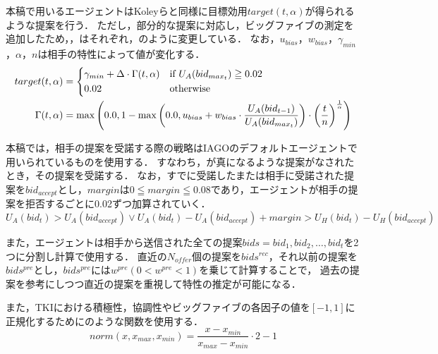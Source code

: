 本稿で用いるエージェントはKoleyらと同様に目標効用$target(t,\alpha)$が得られるような提案を行う．
ただし，部分的な提案に対応し，ビッグファイブの測定を追加したため，，はそれぞれ，のように変更している．
なお，$u_{bias}$，$w_{bias}$，$\gamma_{min}$，$\alpha$，$n$は相手の特性によって値が変化する．
\begin{align}
    target(t,\alpha) &= 
    \begin{cases*}
        \gamma_{min} + \Delta \cdot \Gamma(t,\alpha) & if $U_A(bid_{max_t}) \geqq 0.02$  \\
        0.02 & otherwise 
    \end{cases*} \label{eq:newtarget}\\
    \Gamma(t,\alpha) &= \max \left( 0.0, 1 - \max \left( 0.0, u_{bias} + w_{bias} \cdot \frac{U_A(bid_{t - 1})}{U_A(bid_{max_t})} \right) \cdot \left( \frac{t}{n} \right)^{\frac{1}{\alpha}} \right) \label{eq:newgamma}
\end{align}

本稿では，相手の提案を受諾する際の戦略はIAGOのデフォルトエージェントで用いられているものを使用する．
すなわち，が真になるような提案がなされたとき，その提案を受諾する．
なお，すでに受諾したまたは相手に受諾された提案を$bid_{accept}$とし，$margin$は$0 \leqq margin \leqq 0.08$であり，エージェントが相手の提案を拒否するごとに0.02ずつ加算されていく．
\begin{equation}
    U_A(bid_t) > U_A(bid_{accept}) \vee  U_A(bid_t) - U_A(bid_{accept}) + margin > U_H(bid_t) - U_H(bid_{accept}) 
    \label{eq:acceptance}
\end{equation}

また，エージェントは相手から送信された全ての提案$bids = {bid_1, bid_2, \ldots , bid_t}$を2つに分割し計算で使用する．
直近の$N_{offer}$個の提案を$bids^{rec}$，それ以前の提案を$bids^{pre}$とし，$bids^{pre}$には$w^{pre}(0 < w^{pre} < 1)$を乗じて計算することで，
過去の提案を参考にしつつ直近の提案を重視して特性の推定が可能になる．

また，TKIにおける積極性，協調性やビッグファイブの各因子の値を$[-1, 1]$に正規化するためにのような関数を使用する．
\begin{equation}
    norm(x, x_{max}, x_{min}) = \frac{x - x_{min}}{x_{max} - x_{min}} \cdot 2 - 1
    \label{eq:normarize}
\end{equation}

